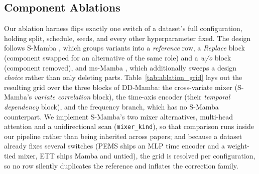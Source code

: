 \documentclass[review,12pt]{elsarticle}
\newcommand{\model}{DD-Mamba}
\begin{document}
\subsection{Component Ablations}
\label{sec:ablation}

Our ablation harness flips exactly one switch of a dataset's full
configuration, holding split, schedule, seeds, and every other
hyperparameter fixed. The design follows S-Mamba \cite{smamba}, which groups
variants into a \emph{reference} row, a \emph{Replace} block (component
swapped for an alternative of the same role) and a \emph{w/o} block
(component removed), and ms-Mamba \cite{msmamba}, which additionally sweeps a
design \emph{choice} rather than only deleting parts.
Table~\ref{tab:ablation_grid} lays out the resulting grid over the three
blocks of \model{}: the cross-variate mixer (S-Mamba's \emph{variate
correlation} block), the time-axis encoder (their \emph{temporal dependency}
block), and the frequency branch, which has no S-Mamba counterpart. We
implement S-Mamba's two mixer alternatives, multi-head attention and a
unidirectional scan (\texttt{mixer\_kind}), so that comparison runs inside
our pipeline rather than being inherited across papers; and because a dataset
already fixes several switches (PEMS ships an MLP time encoder and a
weight-tied mixer, ETT ships Mamba and untied), the grid is resolved per
configuration, so no row silently duplicates the reference and inflates the
correction family.
\end{document}

